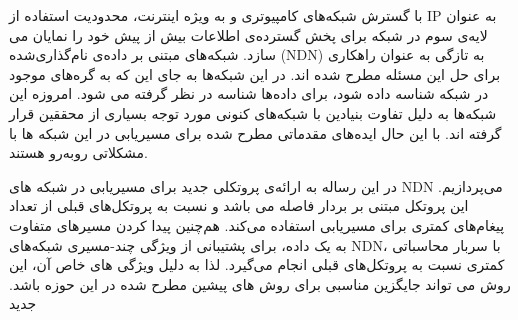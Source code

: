 

\pagestyle{empty}

\begin{center}
\end{center}

با گسترش شبکه‌های کامپیوتری و به ویژه اینترنت، محدودیت استفاده از IP به عنوان لایه‌ی سوم در شبکه برای پخش گسترده‌ی اطلاعات بیش از پیش خود را نمایان می سازد. شبکه‌های مبتنی بر داده‌ی نام‌گذاری‌شده (NDN) به تازگی به عنوان راهکاری برای حل این مسئله مطرح شده اند. در این شبکه‌ها به جای این که به گره‌های موجود در شبکه شناسه داده شود، برای داده‌ها شناسه در نظر گرفته می شود. امروزه این شبکه‌ها به دلیل تفاوت بنیادین با شبکه‌های کنونی مورد توجه بسیاری از محققین قرار گرفته اند. با این حال ایده‌های مقدماتی مطرح شده برای مسیریابی در این شبکه ها با مشکلاتی روبه‌رو هستند. 

در این رساله به ارائه‌ی پروتکلی جدید برای مسیریابی در شبکه های ‌NDN می‌پردازیم. این پروتکل مبتنی بر بردار فاصله می باشد و نسبت به پروتکل‌های قبلی از تعداد پیغام‌های کمتری برای مسیریابی استفاده می‌کند. هم‌چنین پیدا کردن مسیرهای متفاوت به یک داده، برای پشتیبانی از ویژگی چند-مسیری شبکه‌های NDN، با سربار محاسباتی کمتری نسبت به پروتکل‌های قبلی انجام می‌گیرد. لذا به دلیل ویژگی های خاص آن، این روش می تواند جایگزین مناسبی برای روش های پیشین مطرح شده در این حوزه باشد.
‌جدید
